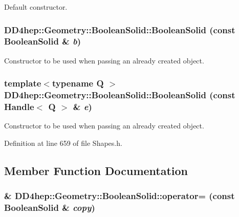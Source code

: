 Default constructor. \hypertarget{class_d_d4hep_1_1_geometry_1_1_boolean_solid_a6a37b0a3bb546640df42f3cfa9cb3680}{
\subsubsection[{BooleanSolid}]{\setlength{\rightskip}{0pt plus 5cm}DD4hep::Geometry::BooleanSolid::BooleanSolid (const {\bf BooleanSolid} \& {\em b})}}
\label{class_d_d4hep_1_1_geometry_1_1_boolean_solid_a6a37b0a3bb546640df42f3cfa9cb3680}


Constructor to be used when passing an already created object. \hypertarget{class_d_d4hep_1_1_geometry_1_1_boolean_solid_a2808abd6768240d7b58e6de60effee0a}{
\subsubsection[{BooleanSolid}]{\setlength{\rightskip}{0pt plus 5cm}template$<$typename Q $>$ DD4hep::Geometry::BooleanSolid::BooleanSolid (const {\bf Handle}$<$ Q $>$ \& {\em e})}}
\label{class_d_d4hep_1_1_geometry_1_1_boolean_solid_a2808abd6768240d7b58e6de60effee0a}


Constructor to be used when passing an already created object. 

Definition at line 659 of file Shapes.h.

\subsection{Member Function Documentation}
\hypertarget{class_d_d4hep_1_1_geometry_1_1_boolean_solid_a454e550eb5ec2c515b1c38bc8dc54914}{
\subsubsection[{operator=}]{\& DD4hep::Geometry::BooleanSolid::operator= (const {\bf BooleanSolid} \& {\em copy})}}
\label{class_d_d4hep_1_1_geometry_1_1_boolean_solid_a454e550eb5ec2c515b1c38bc8dc54914}


